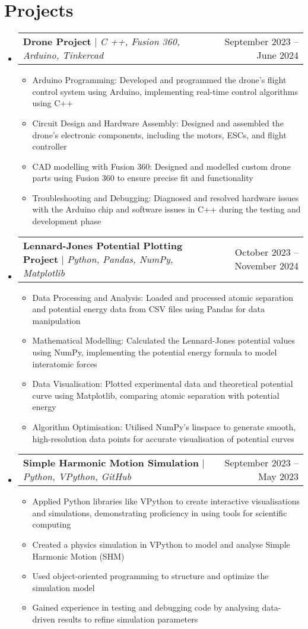 \documentclass[letterpaper,11pt]{article}
\makeatletter
\newcommand{\resumeItem}[1]{
  \item\small{
    {#1 \vspace{-2pt}}
  }
}
\newcommand{\resumeProjectHeading}[2]{
    \item
    \begin{tabular*}{0.97\textwidth}{l@{\extracolsep{\fill}}r}
      \small#1 & #2 \\
    \end{tabular*}\vspace{-7pt}
}
\newcommand{\resumeSubHeadingListStart}{\begin{itemize}[leftmargin=0.15in, label={}]}
\newcommand{\resumeSubHeadingListEnd}{\end{itemize}}
\newcommand{\resumeItemListStart}{\begin{itemize}}
\newcommand{\resumeItemListEnd}{\end{itemize}\vspace{-5pt}}
\makeatother
\begin{document}
\section{Projects}
    \resumeSubHeadingListStart
          \resumeProjectHeading
          {\textbf{Drone Project} $|$ \emph{C ++, Fusion 360, Arduino, Tinkercad}}{September 2023 -- June 2024}
          \resumeItemListStart
            \resumeItem{Arduino Programming: Developed and programmed the
drone’s flight control system using Arduino, implementing
real-time control algorithms using C++}
            \resumeItem{Circuit Design and Hardware Assembly: Designed and
assembled the drone’s electronic components, including the
motors, ESCs, and flight controller}
            \resumeItem{CAD modelling with Fusion 360: Designed and modelled custom drone parts using Fusion 360 to ensure precise fit and functionality }
            \resumeItem{Troubleshooting and Debugging: Diagnosed and resolved hardware issues with the Arduino chip and software issues in C++ during the
testing and development phase}
          \resumeItemListEnd
      \resumeProjectHeading
          {\textbf{Lennard-Jones Potential Plotting Project} $|$ \emph{Python, Pandas, NumPy, Matplotlib}}{October 2023 -- November 2024}
          \resumeItemListStart
            \resumeItem{Data Processing and Analysis: Loaded and processed atomic separation and potential energy data from CSV files using Pandas for data manipulation}
            \resumeItem{Mathematical Modelling: Calculated the Lennard-Jones potential values using NumPy, implementing the potential energy formula to model interatomic forces}
            \resumeItem{Data Visualisation: Plotted experimental data and theoretical potential curve using Matplotlib, comparing atomic separation with potential energy}
            \resumeItem{Algorithm Optimisation: Utilised NumPy's linspace to generate smooth, high-resolution data points for accurate visualisation of potential curves}
          \resumeItemListEnd
      \resumeProjectHeading
          {\textbf{Simple Harmonic Motion Simulation} $|$ \emph{Python, VPython, GitHub}}{September 2023 -- May 2023}
          \resumeItemListStart
            \resumeItem{Applied Python libraries like VPython to create interactive visualisations and simulations,
demonstrating proficiency in using tools for scientific computing}
            \resumeItem{Created a physics simulation in VPython to model and analyse Simple Harmonic Motion (SHM)}
            \resumeItem{Used object-oriented programming to structure and optimize the simulation model}
            \resumeItem{Gained experience in testing and debugging code by analysing data-driven results to refine simulation parameters}
          \resumeItemListEnd
    \resumeSubHeadingListEnd
\end{document}
